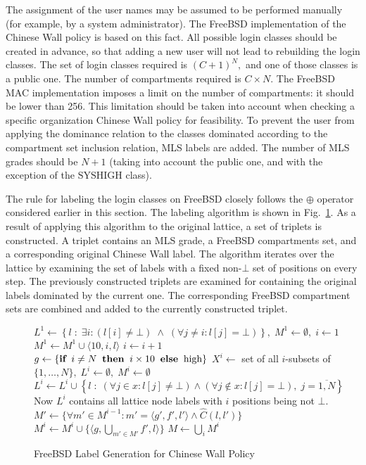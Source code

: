 \documentclass[10pt,a4paper,conference,onecolumn]{IEEEtran}
\begin{document}
The assignment of the user names may be assumed to be performed
manually (for example, by a system administrator). The FreeBSD implementation 
of the Chinese Wall policy is based on this fact. All possible
login classes should be created in advance, so that adding a new user
will not lead to rebuilding the login classes. The set of login classes
required is $(C+1)^N,$ and one of those classes is a public one. The number 
of compartments required is $C\times N$. The FreeBSD MAC implementation 
imposes a limit on the number of compartments: it should be lower than 256.
This limitation should be taken into account when checking a specific organization
Chinese Wall policy for feasibility. To prevent the user from applying the 
dominance relation to the classes dominated according to the compartment 
set inclusion relation, MLS labels are added. The number of MLS grades
should be $N+1$ (taking into account the public one, and with
the exception of the $\mbox{SYSHIGH}$ class).

The rule for labeling the login classes
on FreeBSD closely follows the $\oplus$ operator considered earlier in this section.
The labeling algorithm is shown in Fig.~\ref{KBER:ChWall}. As a result
of applying this algorithm to the original lattice, a set of triplets 
is constructed. A triplet contains an MLS grade, a FreeBSD compartments set, and
a corresponding original Chinese Wall label. The algorithm iterates over the
lattice by examining the set of labels with a fixed non-$\bot$ set of positions 
on every step. The previously constructed triplets are examined for containing
the original labels dominated by the current one. The corresponding FreeBSD
compartment sets are combined and added to the currently constructed triplet. 

\begin{figure}[ht]
\begin{algorithmic}[1]
\State $L^1\gets\left\{l \;:\; \exists i: (l[i]\neq\bot) \;\wedge\; (\forall j\neq i : l[j]=\bot)\right\},\;M^1 \gets \emptyset,\; i\gets 1$
        \State $M^1 \gets M^1 \cup \langle 10, i, l\rangle$
  \State $i\gets i+1$
\EndFor
{}
        \State $g \gets \{\mbox{\bfseries if} \;\; i\neq N \;\;\mbox{\bfseries then}\;\; i\times 10 \;\;\mbox{\bfseries else}\;\;\mbox{high}\}$
        \State $X^i \gets $ set of all $i$-subsets of $\{1,\ldots, N\}, \; L^i \gets \emptyset,\; M^i \gets \emptyset$
                $L^i \gets L^i \cup \left\{l \;:\; (\forall j \in x : l[j]\neq\bot) \wedge (\forall j \notin x : l[j]=\bot), \; j=\overline{1,N}\right\}$
                \Statex Now $L^i$ contains all lattice node labels with $i$ positions being not $\bot$.
        \EndFor
                \State $M'\gets\{\forall m'\in M^{i-1}: m'=\langle g',f',l'\rangle \wedge \hat{C}(l,l')\}$
                \State $M^i\gets M^i\cup\{\langle g, \bigcup_{m'\in M'}f', l\rangle\}$
        \EndFor
\EndFor
\State $M\gets{\bigcup}_{i} M^i$
\end{algorithmic}
\caption{FreeBSD Label Generation for Chinese Wall Policy}
\label{KBER:ChWall}
\end{figure}
\end{document}
